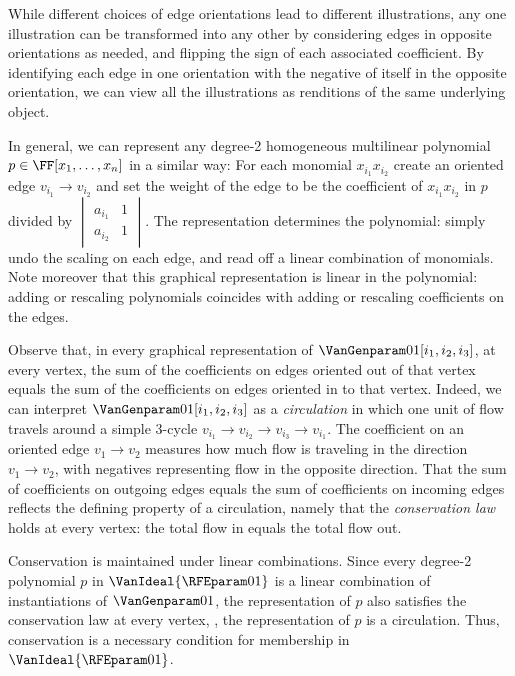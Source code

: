 While different choices of edge orientations lead to different illustrations,
any one illustration can be transformed into any other by
considering edges in opposite orientations as needed,
and flipping the sign of each associated coefficient.
By identifying each edge in one orientation with the negative of itself in the
opposite orientation,
we can view all the illustrations as renditions of the same underlying object.

In general, we can represent any degree-2 homogeneous multilinear
polynomial \(p\in\FF[x_1,\ldots,x_n]\) in a similar way:
For each monomial $x_{i_1}x_{i_2}$ create an oriented edge $v_{i_1}\to v_{i_2}$ and set the weight of the edge
to be the coefficient of \(x_{i_1}x_{i_2}\) in \(p\) divided by
\(\begin{vmatrix}a_{i_1} & 1\\ a_{i_2} & 1\end{vmatrix}\).
The representation determines the polynomial:
simply undo the scaling on each edge,
and read off a linear combination of monomials.
Note moreover that this graphical representation is linear in the polynomial:
adding or rescaling polynomials coincides with adding or rescaling
coefficients on the edges.

Observe that,
in every graphical representation of \(\VanGenparam01[i_1, i_2, i_3]\),
at every vertex, the sum of the coefficients on edges oriented out of
that vertex equals the sum of the coefficients on edges oriented in to
that vertex.
Indeed, we can interpret \(\VanGenparam01[i_1, i_2, i_3]\) as a
\emph{circulation} in which one unit of flow travels around a simple
3-cycle \(v_{i_1} \to v_{i_2}\to v_{i_3}\to v_{i_1}\).
The coefficient on an oriented edge \(v_1\to v_2\) measures how much
flow is traveling in the direction \(v_1\to v_2\),
with negatives representing flow in the opposite direction.
That the sum of coefficients on outgoing edges equals the sum of coefficients on incoming edges reflects the defining property of a circulation, namely that the
\emph{conservation law} holds at every vertex:
the total flow in equals the total flow out.

Conservation is maintained under linear combinations. 
Since every degree-2 polynomial $p$ in \(\VanIdeal{\RFEparam01}\) is a
linear combination of instantiations of \(\VanGenparam01\), the representation of $p$ also satisfies the conservation law at every vertex, \ie, the representation of $p$ is a circulation. 
Thus, conservation is a necessary condition for membership in
\(\VanIdeal{\RFEparam01}\).

